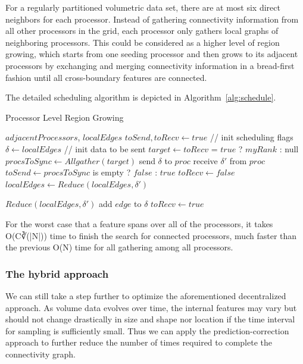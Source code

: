 \documentclass[10pt, conference, compsocconf]{IEEEtran}
\begin{document}
For a regularly partitioned volumetric data set, there are at most six direct neighbors for each processor. Instead of gathering connectivity information from all other processors in the grid, each processor only gathers local graphs of neighboring processors. This could be considered as a higher level of region growing, which starts from one seeding processor and then grows to its adjacent processors by exchanging and merging connectivity information in a bread-first fashion until all cross-boundary features are connected.

The detailed scheduling algorithm is depicted in Algorithm~\ref{alg:schedule}.
\begin{algorithm}
\caption{Processor Level Region Growing}
\label{alg:schedule}
\begin{algorithmic}[1]
\REQUIRE $adjacentProcessors$, $localEdges$
\STATE $toSend, toRecv \leftarrow true$	// init scheduling flags
\STATE $\delta \leftarrow localEdges$	// init data to be sent
	\STATE $target \leftarrow toRecv$ = $true$ ? $myRank$ : null
	\STATE $procsToSync \leftarrow Allgather(target)$
			\STATE send $\delta$ to $proc$
		\ENDIF
			\STATE receive $\delta\prime$ from $proc$
		\ENDIF
	\ENDFOR
	\STATE $toSend \leftarrow procsToSync$ is empty ? $false$ : $true$
	\STATE $toRecv \leftarrow false$
	\STATE $localEdges \leftarrow Reduce(localEdges, \delta\prime)$
\ENDWHILE
\end{algorithmic}
\begin{algorithmic} \STATE \end{algorithmic}	%
\begin{algorithmic}[1]
\STATE $Reduce(localEdges, \delta\prime)$
			\STATE add $edge$ to $\delta$
			\STATE $toRecv \leftarrow true$
		\ENDIF
	\ENDFOR	
\end{algorithmic}
\end{algorithm}

For the worst case that a feature spans over all of the processors, it takes O(C∛(|N|)) time \marginpar{\textcolor{red}{what is this?}} to finish the search for connected processors, much faster than the previous O(N) time for all gathering among all processors.

\subsubsection{The hybrid approach}
We can still take a step further to optimize the aforementioned decentralized approach. As volume data evolves over time, the internal features may vary but should not change drastically in size and shape nor location if the time interval for sampling is sufficiently small. Thus we can apply the prediction-correction approach to further reduce the number of times required to complete the connectivity graph.
\end{document}

